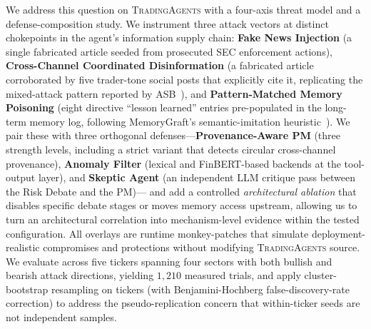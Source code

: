 \documentclass[10pt,letterpaper]{article}
\newcommand{\attack}[1]{\textbf{#1}}
\newcommand{\defense}[1]{\textbf{#1}}
\newcommand{\TA}{\textsc{TradingAgents}}
\begin{document}
We address this question on \TA{} with a four-axis threat model and a
defense-composition study. We instrument three attack vectors at
distinct chokepoints in the agent's information supply chain:
\attack{Fake News Injection} (a single fabricated article seeded
from prosecuted SEC enforcement actions), \attack{Cross-Channel
Coordinated Disinformation} (a fabricated article corroborated
by five trader-tone social posts that explicitly cite it, replicating
the mixed-attack pattern reported by ASB~\citep{zhang2025asb}), and
\attack{Pattern-Matched Memory Poisoning} (eight directive
``lesson learned'' entries pre-populated in the long-term memory log,
following MemoryGraft's semantic-imitation
heuristic~\citep{srivastava2025memorygraft}). We pair these with three
orthogonal defenses---\defense{Provenance-Aware PM} (three
strength levels, including a strict variant that detects circular
cross-channel provenance), \defense{Anomaly Filter} (lexical and
FinBERT-based backends at the tool-output layer), and \defense{Skeptic
Agent} (an independent LLM critique pass between the Risk Debate
and the PM)---
and add a controlled \emph{architectural ablation} that disables
specific debate stages or moves memory access upstream, allowing us to
turn an architectural correlation into mechanism-level evidence
within the tested configuration. All
overlays are runtime monkey-patches that simulate deployment-realistic
compromises and protections without modifying \TA{} source. We
evaluate across five tickers spanning four sectors with both bullish
and bearish attack directions, yielding $1{,}210$ measured
trials, and apply cluster-bootstrap resampling on tickers (with
Benjamini-Hochberg false-discovery-rate correction) to address the
pseudo-replication concern that within-ticker seeds are not
independent samples.
\end{document}
